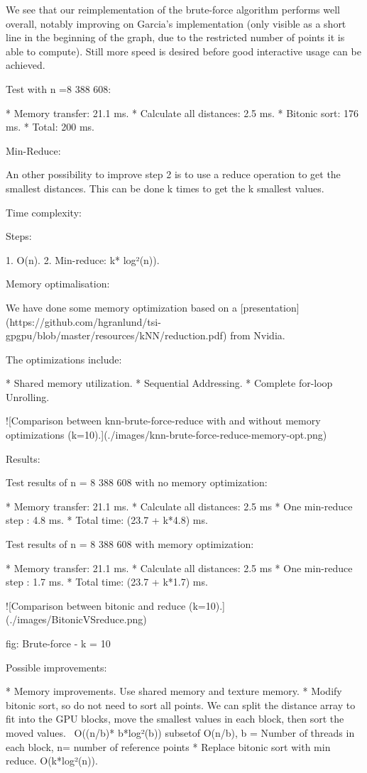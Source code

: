 We see that our reimplementation of the brute-force algorithm performs well overall, notably improving on Garcia's implementation (only visible as a short line in the beginning of the graph, due to the restricted number of points it is able to compute). Still more speed is desired before good interactive usage can be achieved.

Test with n =8 388 608:

* Memory transfer:  21.1 ms.
* Calculate all distances: 2.5 ms.
* Bitonic sort:  176 ms.
* Total: 200 ms.

Min-Reduce:

An other possibility to improve step 2 is to use a reduce operation to get the smallest distances. This can be done k times to get the k smallest values.

Time complexity:

Steps:

1. O(n).
2. Min-reduce: k* log²(n)).

Memory optimalisation:

We have done some memory optimization based on a [presentation](https://github.com/hgranlund/tsi-gpgpu/blob/master/resources/kNN/reduction.pdf) from Nvidia.

The optimizations include:

* Shared memory utilization.
* Sequential Addressing.
* Complete for-loop Unrolling.

![Comparison between knn-brute-force-reduce with and without memory optimizations (k=10).](./images/knn-brute-force-reduce-memory-opt.png)

Results:

Test results of n = 8 388 608 with no memory optimization:

*  Memory transfer:  21.1 ms.
*  Calculate all distances: 2.5 ms
*  One min-reduce step : 4.8 ms.
*  Total time: (23.7 + k*4.8) ms.

Test results of n = 8 388 608 with memory optimization:

*  Memory transfer:  21.1 ms.
*  Calculate all distances: 2.5 ms
*  One min-reduce step : 1.7 ms.
*  Total time: (23.7 + k*1.7) ms.

![Comparison between bitonic and reduce (k=10).](./images/BitonicVSreduce.png)

fig: Brute-force - k = 10

Possible improvements:

* Memory improvements. Use shared memory and texture memory.
* Modify bitonic sort, so do not need to sort all points. We can split the distance array to fit into the GPU blocks, move the smallest values in each block, then sort the moved values. ~O((n/b)* b*log²(b)) subsetof O(n/b), b = Number of threads in each block, n= number of reference points
* Replace bitonic sort with min reduce. O(k*log²(n)).

